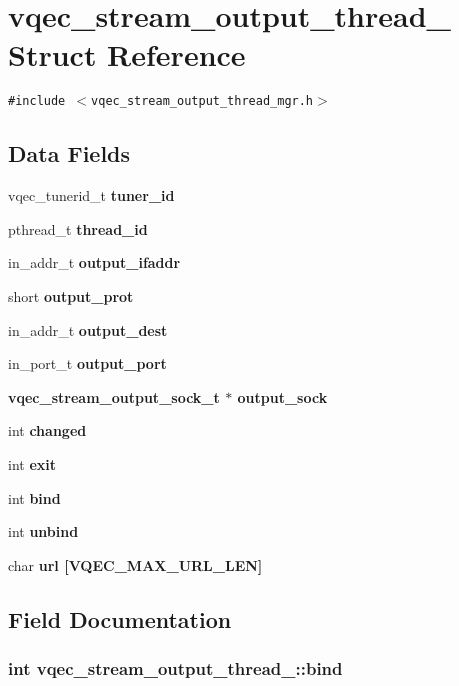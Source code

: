 \section{vqec\_\-stream\_\-output\_\-thread\_\- Struct Reference}
\label{structvqec__stream__output__thread__}
{\tt \#include $<$vqec\_\-stream\_\-output\_\-thread\_\-mgr.h$>$}

\subsection*{Data Fields}
\begin{CompactItemize}
\item 
vqec\_\-tunerid\_\-t \bf{tuner\_\-id}
\item 
pthread\_\-t \bf{thread\_\-id}
\item 
in\_\-addr\_\-t \bf{output\_\-ifaddr}
\item 
short \bf{output\_\-prot}
\item 
in\_\-addr\_\-t \bf{output\_\-dest}
\item 
in\_\-port\_\-t \bf{output\_\-port}
\item 
\bf{vqec\_\-stream\_\-output\_\-sock\_\-t} $\ast$ \bf{output\_\-sock}
\item 
int \bf{changed}
\item 
int \bf{exit}
\item 
int \bf{bind}
\item 
int \bf{unbind}
\item 
char \bf{url} [VQEC\_\-MAX\_\-URL\_\-LEN]
\end{CompactItemize}


\subsection{Field Documentation}
\subsubsection{\setlength{\rightskip}{0pt plus 5cm}int \bf{vqec\_\-stream\_\-output\_\-thread\_\-::bind}}\label{structvqec__stream__output__thread___ac2b3b42fcaa9ae3f2f617edfa2b14b7}


